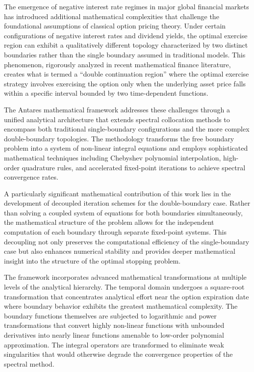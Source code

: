 \documentclass[
  american,
  11pt,
  11pt,
  letterpaper,
  onecolumn]{article}
\begin{document}
The emergence of negative interest rate regimes in major global
financial markets has introduced additional mathematical complexities
that challenge the foundational assumptions of classical option pricing
theory. Under certain configurations of negative interest rates and
dividend yields, the optimal exercise region can exhibit a qualitatively
different topology characterized by two distinct boundaries rather than
the single boundary assumed in traditional models. This phenomenon,
rigorously analyzed in recent mathematical finance literature, creates
what is termed a ``double continuation region'' where the optimal
exercise strategy involves exercising the option only when the
underlying asset price falls within a specific interval bounded by two
time-dependent functions.

The Antares mathematical framework addresses these challenges through a
unified analytical architecture that extends spectral collocation
methods to encompass both traditional single-boundary configurations and
the more complex double-boundary topologies. The methodology transforms
the free boundary problem into a system of non-linear integral equations
and employs sophisticated mathematical techniques including Chebyshev
polynomial interpolation, high-order quadrature rules, and accelerated
fixed-point iterations to achieve spectral convergence rates.

A particularly significant mathematical contribution of this work lies
in the development of decoupled iteration schemes for the
double-boundary case. Rather than solving a coupled system of equations
for both boundaries simultaneously, the mathematical structure of the
problem allows for the independent computation of each boundary through
separate fixed-point systems. This decoupling not only preserves the
computational efficiency of the single-boundary case but also enhances
numerical stability and provides deeper mathematical insight into the
structure of the optimal stopping problem.

The framework incorporates advanced mathematical transformations at
multiple levels of the analytical hierarchy. The temporal domain
undergoes a square-root transformation that concentrates analytical
effort near the option expiration date where boundary behavior exhibits
the greatest mathematical complexity. The boundary functions themselves
are subjected to logarithmic and power transformations that convert
highly non-linear functions with unbounded derivatives into nearly
linear functions amenable to low-order polynomial approximation. The
integral operators are transformed to eliminate weak singularities that
would otherwise degrade the convergence properties of the spectral
method.
\end{document}
